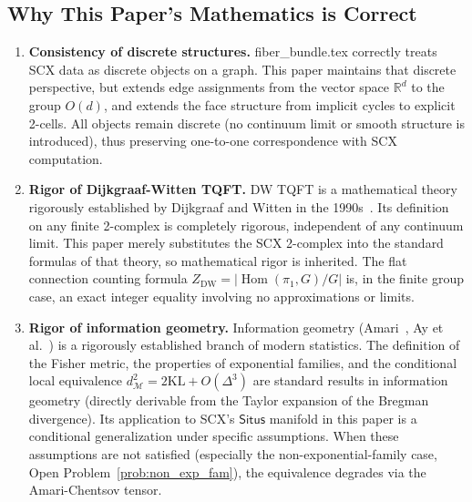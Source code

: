 \documentclass[12pt,a4paper]{article}
\theoremstyle{definition}
\theoremstyle{remark}
\theoremstyle{definition}
\newcommand{\R}{\mathbb{R}}
\newcommand{\Od}{O(d)}
\newcommand{\Situs}{\textsf{Situs}}
\newcommand{\KL}{\mathrm{KL}}
\newcommand{\GeoDist}{d_{\mathcal{M}}}
\newcommand{\DW}{\mathrm{DW}}
\DeclareMathOperator{\Hom}{Hom}
\begin{document}
\addtocounter{footnote}{-2}
\addtocounter{footnote}{1}

\subsection{Why This Paper's Mathematics is Correct}

\begin{enumerate}[label=(\arabic*)]
    \item \textbf{Consistency of discrete structures.}
    fiber\_bundle.tex correctly treats SCX data as discrete objects on a graph.
    This paper maintains that discrete perspective, but extends edge assignments from the vector space $\R^d$ to the group $\Od$,
    and extends the face structure from implicit cycles to explicit 2-cells.
    All objects remain discrete (no continuum limit or smooth structure is introduced),
    thus preserving one-to-one correspondence with SCX computation.

    \item \textbf{Rigor of Dijkgraaf-Witten TQFT.}
    DW TQFT is a mathematical theory rigorously established by Dijkgraaf and Witten in the 1990s~\cite{dijkgraaf1990}.
    Its definition on any finite 2-complex is completely rigorous, independent of any continuum limit.
    This paper merely substitutes the SCX 2-complex into the standard formulas of that theory, so mathematical rigor is inherited.
    The flat connection counting formula $Z_{\DW} = |\Hom(\pi_1, G)/G|$ is, in the finite group case, an exact integer equality
    involving no approximations or limits.

    \item \textbf{Rigor of information geometry.}
    Information geometry (Amari~\cite{amari2016}, Ay et al.~\cite{ay2017}) is a rigorously established branch of modern statistics.
    The definition of the Fisher metric, the properties of exponential families, and the conditional local equivalence $\GeoDist^2 = 2\KL + O(\Delta^3)$
    are standard results in information geometry (directly derivable from the Taylor expansion of the Bregman divergence).
    Its application to SCX's $\Situs$ manifold in this paper is a conditional generalization under specific assumptions.
    When these assumptions are not satisfied (especially the non-exponential-family case, Open Problem~\ref{prob:non_exp_fam}), the equivalence degrades via the Amari-Chentsov tensor.


\end{enumerate}
\end{document}
